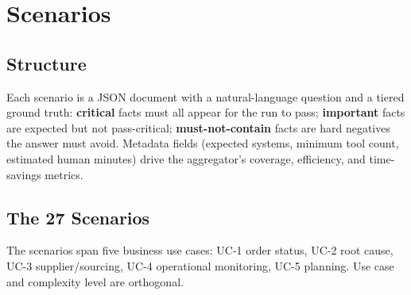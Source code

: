 
\chapter{Scenarios}
\label{ch:scenarios}

\section{Structure}

Each scenario is a JSON document with a natural-language question and a tiered ground truth: \textbf{critical} facts must all appear for the run to pass; \textbf{important} facts are expected but not pass-critical; \textbf{must-not-contain} facts are hard negatives the answer must avoid. Metadata fields (expected systems, minimum tool count, estimated human minutes) drive the aggregator's coverage, efficiency, and time-savings metrics.

\section{The 27 Scenarios}

The scenarios span five business use cases: UC-1 order status, UC-2 root cause, UC-3 supplier/sourcing, UC-4 operational monitoring, UC-5 planning. Use case and complexity level are orthogonal.

